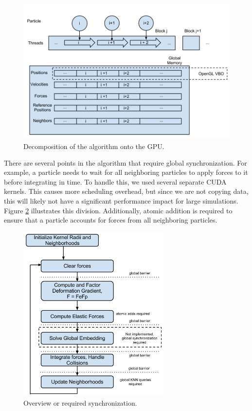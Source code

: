 \documentclass[cameraready]{acmsiggraph-awb}
\begin{document}
\begin{figure}
\begin{centering}
\includegraphics[width = 5in]{Figures/threadDecomp.png}
\caption{Decomposition of the algorithm onto the GPU.}
\label{fig:mapping}
\end{centering}
\end{figure}

There are several points in the algorithm that require global synchronization.  For example, a particle needs to wait for all neighboring particles to apply forces to it before integrating in time.  To handle this, we used several separate CUDA kernels.  This causes more scheduling overhead, but since we are not copying data, this will likely not have a significant performance impact for large simulations.  Figure \ref{fig:kernelDivision} illustrates this division.  Additionally, atomic addition is required to ensure that a particle accounts for forces from all neighboring particles.

\begin{figure}
\begin{centering}
\includegraphics[width = 3in]{Figures/AlgorithmFlowchart.png}
\caption{Overview or required synchronization.}
\label{fig:kernelDivision}
\end{centering}
\end{figure}
\end{document}
